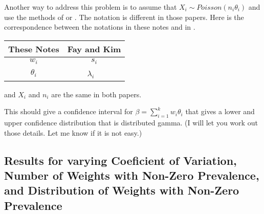 \documentclass{article}
\begin{document}
Another way to address this problem is to assume that $X_i \sim Poisson( n_i \theta_i)$ and use the methods
of \citet{FayF:1997} or \citet{FayK:2017}.
The notation is different in those papers. Here is the correspondence between the notations in these notes and in \citet{FayK:2017}.

\begin{tabular}{cc}
These Notes & Fay and Kim  \\ \hline
$w_i$     & $s_i$ \\
$\theta_i$ & $\lambda_i$ \
\end{tabular}

and $X_i$ and $n_i$ are the same in both papers. 


This should give a confidence interval for $\beta=\sum_{i=1}^{k} w_i \theta_i$
that gives a lower and upper confidence distribution that is distributed gamma. (I will let you work out those details. Let me know if it is not easy.)

\subsection{Results for varying Coeficient of Variation, Number of Weights with Non-Zero Prevalence, and Distribution of Weights with Non-Zero Prevalence}
\end{document}
